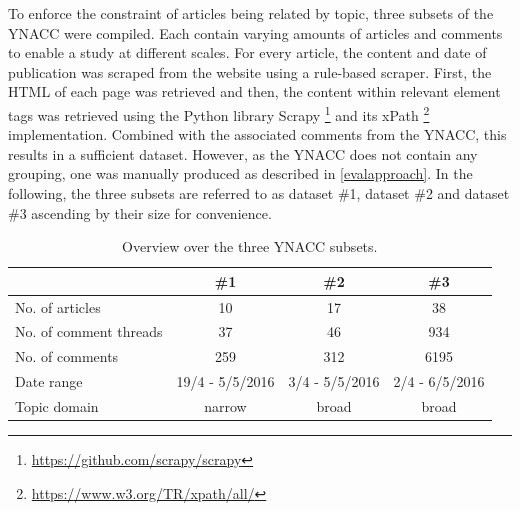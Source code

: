To enforce the constraint of articles being related by topic, three subsets of the YNACC were compiled. Each contain varying amounts of articles and comments to enable a study at different scales. For every article, the content and date of publication was scraped from the website using a rule-based scraper. First, the HTML of each page was retrieved and then, the content within relevant element tags was retrieved using the Python library Scrapy \footnote{\url{https://github.com/scrapy/scrapy}} and its xPath \footnote{\url{https://www.w3.org/TR/xpath/all/}} implementation. Combined with the associated comments from the YNACC, this results in a sufficient dataset. However, as the YNACC does not contain any grouping, one was manually produced as described in \autoref{evalapproach}. In the following, the three subsets are referred to as dataset \#1, dataset \#2 and dataset \#3 ascending by their size for convenience.

\begin{table}[t]
\centering
\caption{Overview over the three YNACC subsets.}
\begin{tabular}{||l||c|c|c||}
\hline
 & {\#}1 & {\#}2 & {\#}3 \\
\hline
No. of articles & 10 & 17 & 38 \\
No. of comment threads & 37 & 46 & 934 \\
No. of comments & 259 & 312 & 6195 \\
Date range & 19/4 - 5/5/2016 & 3/4 - 5/5/2016 & 2/4 - 6/5/2016 \\
Topic domain & narrow & broad & broad \\
\hline
\end{tabular}
\end{table}

